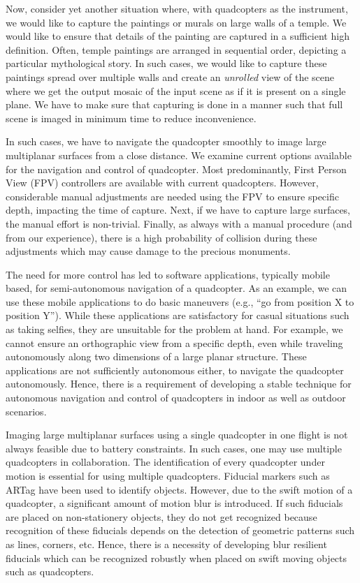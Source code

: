 Now, consider yet another situation where, with quadcopters as the
instrument, we would like to capture the paintings or murals on large
walls of a temple. We would like to ensure that details of the
painting are captured in a sufficient high definition. Often, temple
paintings are arranged in sequential order, depicting a particular
mythological story. In such cases, we would like to capture these
paintings spread over multiple walls and create an \emph{unrolled}
view of the scene where we get the output mosaic of the input scene as if it is
present on a single plane.  We have to make sure that capturing is done in a
manner such that full scene is imaged in minimum time to reduce inconvenience.

In such cases, we have to navigate the quadcopter smoothly to image
large multiplanar surfaces from a close distance. We examine current
options available for the navigation and control of quadcopter.  Most
predominantly, First Person View (FPV) controllers are available with
current quadcopters. However, considerable manual adjustments are
needed using the FPV to ensure specific depth, impacting the time of
capture. Next, if we have to capture large surfaces, the manual effort
is non-trivial.  Finally, as always with a manual procedure (and from
our experience), there is a high probability of collision during
these adjustments which may cause damage to the precious monuments.

The need for more control has led to software applications, typically
mobile based, for semi-autonomous navigation of a quadcopter.  As an
example, we can use these mobile applications to do basic maneuvers
(e.g., ``go from position X to position Y''). While these applications
are satisfactory for casual situations such as taking selfies, they
are unsuitable for the problem at hand.  For example, we cannot ensure
an orthographic view from a specific depth, even while traveling
autonomously along two dimensions of a large planar structure.  These
applications are not sufficiently autonomous either, to navigate the
quadcopter autonomously. Hence, there is a requirement of developing a
stable technique for autonomous navigation and control of quadcopters
in indoor as well as outdoor scenarios.
 
Imaging large multiplanar surfaces using a single quadcopter in one
flight is not always feasible due to battery constraints. In such
cases, one may use multiple quadcopters in collaboration. The
identification of every quadcopter under motion is essential for using
multiple quadcopters. Fiducial markers such as ARTag have been used to
identify objects. However, due to the swift motion of a quadcopter, a
significant amount of motion blur is introduced. If such fiducials are
placed on non-stationery objects, they do not get recognized because
recognition of these fiducials depends on the detection of geometric
patterns such as lines, corners, etc.  Hence, there is a necessity of
developing blur resilient fiducials which can be recognized robustly
when placed on swift moving objects such as quadcopters.

